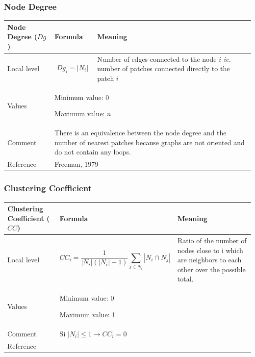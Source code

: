 \documentclass{article}
\begin{document}
\subsubsection{Node Degree}
\label{metric_Dg}
\begin{table}[H]
\begin{tabular}{|m{3.24cm}|m{4.4810004cm}m{7.924cm}|}
\hline
Node Degree ($Dg$) &
\multicolumn{1}{m{4.4810004cm}|}{Formula} &
Meaning\\\hline
Local level

 &
\multicolumn{1}{m{4.4810004cm}|}{\begin{equation*}
{\mathit{Dg}}_{i}=\left|{N}_{i}\right|
\end{equation*}
} &
Number of edges connected to the node $i$ \textit{ie.}
number of patches connected directly to the patch $i$\\\hline
Values &
\multicolumn{2}{m{12.6050005cm}|}{Minimum value: 0

Maximum value:  $n$

}\\\hline
Comment &
\multicolumn{2}{m{12.6050005cm}|}{There is an equivalence between the
node degree and the number of nearest patches because graphs are not
oriented and do not contain any loops.

}\\\hline
Reference &
\multicolumn{2}{m{12.6050005cm}|}{Freeman, 1979}\\\hline
\end{tabular}
\end{table}


\subsubsection{Clustering Coefficient}
\label{metric_CC}
\begin{table}[H]
\begin{tabular}{|m{3.24cm}|m{5.303cm}m{7.103cm}|}
\hline
Clustering Coefficient ($CC$) &
\multicolumn{1}{m{5.303cm}|}{Formula} &
Meaning\\\hline
Local level

 &
\multicolumn{1}{m{5.303cm}|}{\begin{equation*}
{\mathit{CC}}_{i}=\frac{1}{\left|{N}_{i}\right|\left(\left|{N}_{i}\right|-1\right)}\sum
_{j{\in}{N}_{i}}{\left|{N}_{i}{\cap}{N}_{j}\right|}
\end{equation*}
} &
Ratio of the number of nodes close to i which are neighbors to each
other over the possible total. \\\hline
Values &
\multicolumn{2}{m{12.606cm}|}{Minimum value: 0

Maximum value: 1

}\\\hline
Comment &
\multicolumn{2}{m{12.606cm}|}{Si 
$\left|{N}_{i}\right|{\leq}1\rightarrow {\mathit{CC}}_{i}=0$ }\\\hline
Reference &
\multicolumn{2}{m{12.606cm}|}{\cite{Ricotta2000}}\\\hline
\end{tabular}
\end{table}
\end{document}

